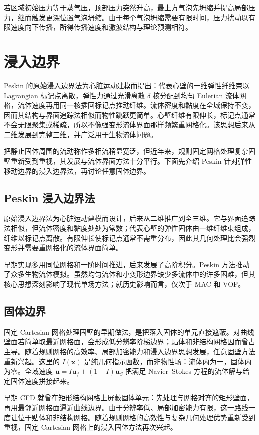 \documentclass[11pt,a4paper,openany,fontset=none]{ctexbook}
\begin{document}
若区域初始压力等于蒸气压，顶部压力突然升高，最上方气泡先坍缩并提高局部压力，继而触发更深位置气泡坍缩。由于每个气泡坍缩需要有限时间，压力扰动以有限速度向下传播，所得传播速度和激波结构与理论预测相符。

\section{浸入边界}
Peskin 的原始浸入边界法为心脏运动建模而提出：代表心壁的一维弹性纤维束以 Lagrangian 标记点离散，弹性力通过光滑离散 $\delta$ 核分配到均匀 Eulerian 流体网格，流体速度再用同一核插回标记点推动纤维。流体密度和黏度在全域保持不变，因而其结构与界面追踪法相似而物性跳跃更简单。心壁纤维有限伸长，标记点通常不会无限聚集或稀疏，所以不像强变形流体界面那样频繁重网格化。该思想后来从二维发展到完整三维，并广泛用于生物流体问题。


把静止固体周围的流动称作多相流稍显宽泛，但近年来，规则固定网格处理复杂固壁重新受到重视，其发展与流体界面方法十分平行。下面先介绍 Peskin 针对弹性移动边界的浸入边界法，再讨论任意固体边界。

\subsection{Peskin 浸入边界法}

原始浸入边界法为心脏运动建模而设计，后来从二维推广到全三维。它与界面追踪法相似，但流体密度和黏度处处为常数；代表心壁的弹性固体由一维纤维束组成，纤维以标记点离散。有限伸长使标记点通常不需重分布，因此其几何处理比会强烈变形并需要重网格化的流体界面简单。

早期实现多用同位网格和一阶时间推进，后来发展了高阶积分。Peskin 方法推动了众多生物流体模拟。虽然均匀流体和小变形边界缺少多流体中的许多困难，但其核心思想深刻影响了现代单场方法；就历史影响而言，仅次于 MAC 和 VOF。

\subsection{固体边界}
固定 Cartesian 网格处理固壁的早期做法，是把落入固体的单元直接遮蔽。对曲线壁面若简单取最近网格面，会形成低分辨率阶梯边界；贴体和非结构网格因而曾占主导。随着规则网格的高效率、局部加密能力和浸入边界思想发展，任意固壁方法重新兴起。这里的 $I(\bm x)$ 是纯几何指示函数，而非物性场：流体内为一，固体内为零。全域速度 $\bm u=I\bm u_f+(1-I)\bm u_S$ 把满足 Navier--Stokes 方程的流体解与给定固体速度拼接起来。


早期 CFD 就曾在矩形结构网格上屏蔽固体单元：先处理与网格对齐的矩形壁面，再用最邻近网格面逼近曲线边界。由于分辨率低、局部加密能力有限，这一路线一度让位于贴体和非结构网格。随着规则网格的高效性与复杂几何处理优势重新受到重视，固定 Cartesian 网格上的浸入固体方法再次兴起。
\end{document}
